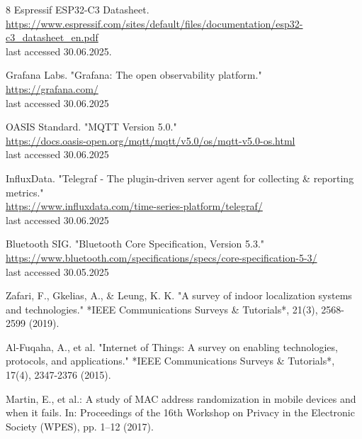 \documentclass[runningheads]{llncs}
\begin{document}
%
% 
% 
%
\begin{thebibliography}{8}
Espressif ESP32-C3 Datasheet.\\
\url{https://www.espressif.com/sites/default/files/documentation/esp32-c3\_datasheet\_en.pdf}\\ last accessed 30.06.2025.



Grafana Labs. "Grafana: The open observability platform."\\
\url{https://grafana.com/}\\
last accessed 30.06.2025

OASIS Standard. "MQTT Version 5.0."\\
\url{https://docs.oasis-open.org/mqtt/mqtt/v5.0/os/mqtt-v5.0-os.html}\\
last accessed 30.06.2025

InfluxData. "Telegraf - The plugin-driven server agent for collecting \& reporting metrics."\\
\url{https://www.influxdata.com/time-series-platform/telegraf/}\\
last accessed 30.06.2025

Bluetooth SIG. "Bluetooth Core Specification, Version 5.3."\\
\url{https://www.bluetooth.com/specifications/specs/core-specification-5-3/}\\
last accessed 30.05.2025

Zafari, F., Gkelias, A., \& Leung, K. K. "A survey of indoor localization systems and technologies." *IEEE Communications Surveys \& Tutorials*, 21(3), 2568-2599 (2019).

Al-Fuqaha, A., et al. "Internet of Things: A survey on enabling technologies, protocols, and applications." *IEEE Communications Surveys \& Tutorials*, 17(4), 2347-2376 (2015).

Martin, E., et al.: A study of MAC address randomization in mobile devices and when it fails. In: Proceedings of the 16th Workshop on Privacy in the Electronic Society (WPES), pp. 1--12 (2017).
\end{thebibliography}
\end{document}
